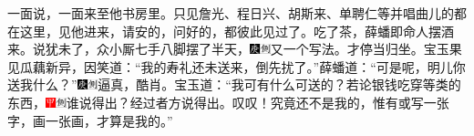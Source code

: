 一面说，一面来至他书房里。只见詹光、程日兴、胡斯来、单聘仁等并唱曲儿的都在这里，见他进来，请安的，问好的，都彼此见过了。吃了茶，薛蟠即命人摆酒来。说犹未了，众小厮七手八脚摆了半天，{\includegraphics[width=3mm]{../Images/00004}\includegraphics[width=3mm]{../Images/00011}\footnotesize \kaishu 又一个写法。}才停当归坐。宝玉果见瓜藕新异，因笑道：“我的寿礼还未送来，倒先扰了。”薛蟠道：“可是呢，明儿你送我什么？”{\includegraphics[width=3mm]{../Images/00004}\includegraphics[width=3mm]{../Images/00011}\footnotesize \kaishu 逼真，酷肖。}宝玉道：“我可有什么可送的？若论银钱吃穿等类的东西，{\includegraphics[width=3mm]{../Images/00002}\includegraphics[width=3mm]{../Images/00011}\footnotesize \kaishu 谁说得出？经过者方说得出。叹叹！}究竟还不是我的，惟有或写一张字，画一张画，才算是我的。”

